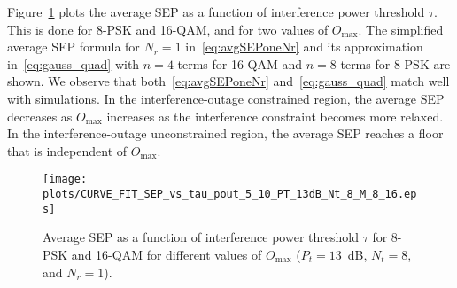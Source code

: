 \documentclass[12pt,draftcls,peerreview,onecolumn]{IEEEtran}
\newcommand{\lam}{\lambda}
\newcommand{\Nt}{{N_t}}
\newcommand{\Nr}{{N_r}}
\newcommand{\Pt}{{P_t}}
\newcommand{\outmax}{O_{\text{max}}}
\newcommand{\itau}{\tau}
\newcommand{\cone}{c_{1}}
\begin{document}
Figure~\ref{fig:SEP_vs_tau_QAM} plots the average SEP as a function of interference power threshold $\tau$. This is done for 8-PSK and 16-QAM, and for two values of $\outmax$. The simplified average SEP formula for $\Nr=1$ in~\eqref{eq:avgSEPoneNr} and its approximation in~\eqref{eq:gauss_quad} with $n = 4$ terms for 16-QAM and $n=8$ terms for 8-PSK  are shown. We observe that both~\eqref{eq:avgSEPoneNr} and~\eqref{eq:gauss_quad} match well with simulations. In the interference-outage constrained region, the average SEP decreases as $\outmax$ increases as the interference constraint becomes more relaxed. In the interference-outage unconstrained region, the average SEP reaches a floor that is  independent of $\outmax$.  %

\begin{figure}
	\centering \texttt{[image: plots/CURVE\_FIT\_SEP\_vs\_tau\_pout\_5\_10\_PT\_13dB\_Nt\_8\_M\_8\_16.eps]}
	\caption{Average SEP as a function of interference power threshold $\itau$ for 8-PSK and 16-QAM for different values of $\outmax$ ($\Pt = 13$~dB, $\Nt=8$, and $\Nr=1$).}
	\label{fig:SEP_vs_tau_QAM}
\end{figure}




\end{document}
